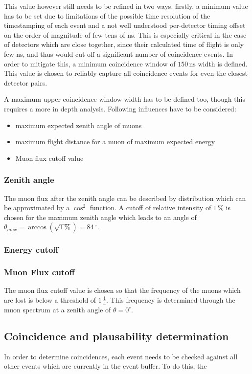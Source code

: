 \documentclass[abstract,toc,los,english,11pt,glossaries]{jluthesis}
\begin{document}
This value however still needs to be refined in two ways. firstly, a minimum value has to be set due to limitations of the possible time resolution of the timestamping of each event and a not well understood per-detector timing offset on the order of magnitude of few tens of ns. This is especially critical in the case of detectors which are close together, since their calculated time of flight is only few ns, and thus would cut off a significant number of coincidence events. In order to mitigate this, a minimum coincidence window of $150\,\text{ns}$ width is defined. This value is chosen to reliably capture all coincidence events for even the closest detector pairs.

A maximum upper coincidence window width has to be defined too, though this requires a more in depth analysis. Following influences have to be considered:
\begin{itemize}
	\item maximum expected zenith angle of muons
	\item maximum flight distance for a muon of maximum expected energy
	\item Muon flux cutoff value
\end{itemize}
\subsubsection*{Zenith angle}
The muon flux after the zenith angle can be described by  distribution\cite{muonenergyspectrum} which can be approximated by a $\cos^2$ function. A cutoff of relative intensity of $1\,\%$ is chosen for the maximum zenith angle which leads to an angle of $\theta_{max} = \arccos\left(\sqrt{1\,\%}\right) = 84\,^\circ$.
\subsubsection*{Energy cutoff}
\subsubsection*{Muon Flux cutoff}
The muon flux cutoff value is chosen so that the frequency of the muons which are lost is below a threshold of $1\,\frac{1}{\text{a}}$. This frequency is determined through the muon spectrum\cite{muonenergyspectrum} at a zenith angle of $\theta = 0^{\circ}$. 
\subsection{Coincidence and plausability determination}
In order to determine coincidences, each event needs to be checked against all other events which are currently in the event buffer. To do this, the 
\end{document}
